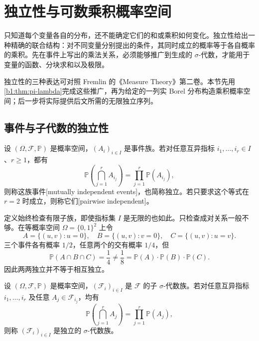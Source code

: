 \section{独立性与可数乘积概率空间}
\label{b1:sec:3002}

只知道每个变量各自的分布，还不能确定它们的和或乘积如何变化。独立性给出一种精确的联合结构：对不同变量分别提出的条件，其同时成立的概率等于各自概率的乘积。先在事件上写出的乘法关系，必须能够推广到生成的 \(\sigma\)-代数，才能用于变量的函数、分块求和以及极限。

\ProseParagraphBreak

独立性的三种表达可对照 Fremlin 的《Measure Theory》第二卷\cite[Definition 272A, Proposition 272D, Theorem 272G, Proposition 272K]{Fremlin2016Measure}。本节先用\cref{b1:thm:pi-lambda}完成这些推广，再为给定的一列实 Borel 分布构造乘积概率空间；后一步将实际提供后文所需的无限独立序列。

\subsection{事件与子代数的独立性}
\label{b1:subsec:300201}

\begin{definition}\label{b1:def:30-independent-events}
设 \((\Omega,\mathcal F,\mathbb P)\) 是概率空间，\((A_i)_{i\in I}\) 是事件族。若对任意互异指标 \(i_1,\ldots,i_r\in I\)、\(r\geq1\)，都有
\[
 \mathbb P\left(\bigcap_{j=1}^rA_{i_j}\right)
 =\prod_{j=1}^r\mathbb P(A_{i_j}),
\]
则称这族事件[mutually independent events]，也简称独立。若只要求这个等式在 \(r=2\) 时成立，则称它们[pairwise independent]。
\end{definition}

定义始终检查有限子族，即使指标集 \(I\) 是无限的也如此。只检查成对关系一般不够。在等概率空间 \(\Omega=\{0,1\}^2\) 上令
\[
 A=\{(u,v):u=0\},
 \quad B=\{(u,v):v=0\},
 \quad C=\{(u,v):u=v\}.
\]
三个事件各有概率 \(1/2\)，任意两个的交有概率 \(1/4\)，但
\[
 \mathbb P(A\cap B\cap C)=\frac14\ne\frac18
 =\mathbb P(A)\cdot\mathbb P(B)\cdot\mathbb P(C).
\]
因此两两独立并不等于相互独立。

\begin{definition}\label{b1:def:30-independent-sigma}
设 \((\Omega,\mathcal F,\mathbb P)\) 是概率空间，\((\mathcal F_i)_{i\in I}\) 是 \(\mathcal F\) 的子 \(\sigma\)-代数族。若对任意互异指标 \(i_1,\ldots,i_r\) 及任意 \(A_j\in\mathcal F_{i_j}\)，均有
\[
 \mathbb P\left(\bigcap_{j=1}^rA_j\right)
 =\prod_{j=1}^r\mathbb P(A_j),
\]
则称 \((\mathcal F_i)_{i\in I}\) 是独立的 \(\sigma\)-代数族。
\end{definition}

